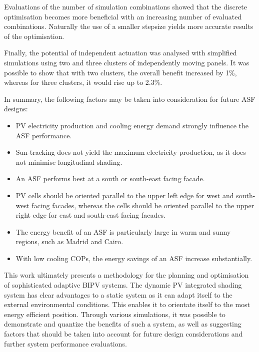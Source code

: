 Evaluations of the number of simulation combinations showed that the discrete optimisation becomes more beneficial with an increasing number of evaluated combinations. Naturally the use of a smaller stepsize yields more accurate results of the optimisation. 

Finally, the potential of independent actuation was analysed with simplified simulations using two and three clusters of independently moving panels. It was possible to show that with two clusters, the overall benefit increased by 1\%, whereas for three clusters, it would rise up to 2.3\%. 

In summary, the following factors may be taken into consideration for future ASF designs:

\begin{itemize}

\item PV electricity production and cooling energy demand strongly influence the ASF performance.
\item Sun-tracking does not yield the maximum electricity production, as it does not minimise longitudinal shading.
\item An ASF performs best at a south or south-east facing facade.
\item PV cells should be oriented parallel to the upper left edge for west and south-west facing facades, whereas the cells should be oriented parallel to the upper right edge for east and south-east facing facades. 
\item The energy benefit of an ASF is particularly large in warm and sunny regions, such as Madrid and Cairo.
\item With low cooling COPs, the energy savings of an ASF increase substantially.

\end{itemize}

This work ultimately presents a methodology for the planning and optimisation of sophisticated adaptive BIPV systems. The dynamic PV integrated shading system has clear advantages to a static system as it can adapt itself to the external environmental conditions. This enables it to orientate itself to the most energy efficient position. Through various simulations, it was possible to demonstrate and quantize the benefits of such a system, as well as suggesting factors that should be taken into account for future design considerations and further system performance evaluations. 